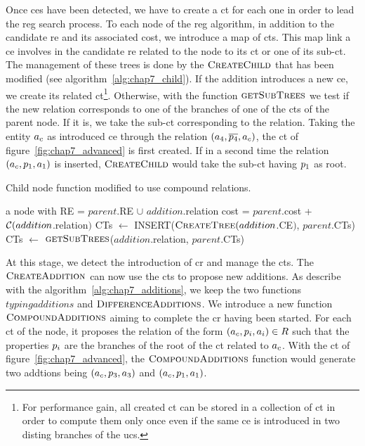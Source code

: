 Once \acrshort{ce}s have been detected, we have to create a \acrfull{ct} for each one in order to lead the \acrshort{reg} search process. To each node of the \acrshort{reg} algorithm, in addition to the candidate \acrshort{re} and its associated cost, we introduce a map of \acrshort{ct}s. This map link a \acrshort{ce} involves in the candidate \acrshort{re} related to the node to its \acrshort{ct} or one of its sub-\acrshort{ct}. The management of these trees is done by the $\textsc{CreateChild}$ that has been modified (see algorithm~\ref{alg:chap7_child}). If the addition introduces a new \acrshort{ce}, we create its related \acrshort{ct}\footnote{For performance gain, all created \acrshort{ct} can be stored in a collection of \acrshort{ct} in order to compute them only once even if the same \acrshort{ce} is introduced in two disting branches of the \acrshort{ucs}.}. Otherwise, with the function $\textsc{getSubTrees}$ we test if the new relation corresponds to one of the branches of one of the \acrshort{ct}s of the parent node. If it is, we take the sub-\acrshort{ct} corresponding to the relation. Taking the entity $a_c$ as introduced \acrshort{ce} through the relation $(a_4, \overline{p_4}, a_c)$, the \acrshort{ct} of figure~\ref{fig:chap7_advanced} is first created. If in a second time the relation $(a_c, p_1, a_1)$ is inserted, $\textsc{CreateChild}$ would take the sub-\acrshort{ct} having $p_1$ as root.

\begin{algorithm}[ht!]
\caption{\label{alg:chap7_child} Child node function modified to use compound relations.}
\begin{algorithmic}
    \State \Return a node with
    \State RE = $parent$.RE $\cup$ $addition$.relation
    \State cost = $parent$.cost + $\mathcal{C}(addition$.relation$)$
    	\State CTs $\leftarrow$ INSERT($\textsc{CreateTree}(addition$.CE$)$, $parent$.CTs)
    \Else
    	\State CTs $\leftarrow$ $\textsc{getSubTrees}$($addition$.relation, $parent$.CTs)
    \EndIf
\EndFunction
\end{algorithmic}
\end{algorithm}

At this stage, we detect the introduction of \acrshort{cr} and manage the \acrshort{ct}s. The $\textsc{CreateAddition}$ can now use the \acrshort{ct}s to propose new additions. As describe with the algorithm~\ref{alg:chap7_additions}, we keep the two functions $typingadditions$ and $\textsc{DifferenceAdditions}$. We introduce a new function $\textsc{CompoundAdditions}$ aiming to complete the \acrshort{cr} having been started. For each \acrshort{ct} of the node, it proposes the relation of the form $(a_c, p_i, a_i) \in R$ such that the properties $p_i$ are the branches of the root of the \acrshort{ct} related to $a_c$. With the  \acrshort{ct} of figure~\ref{fig:chap7_advanced}, the $\textsc{CompoundAdditions}$ function would generate two addtions being $(a_c, p_3, a_3)$ and $(a_c, p_1, a_1)$.

